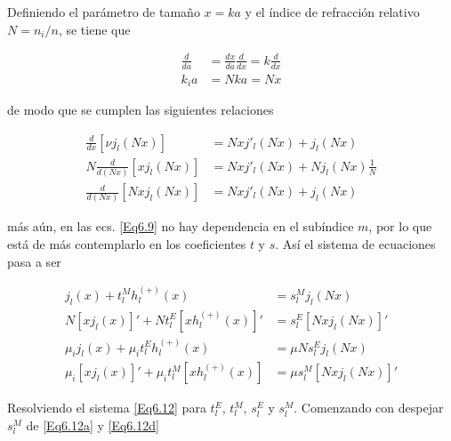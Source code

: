 Definiendo el parámetro de tamaño $x=ka$ y el índice de refracción relativo $N=n_i/n$, se tiene que

\begin{equation}
\begin{aligned}
\frac{d}{da}&=\frac{dx}{da}\frac{d}{dx}=k\frac{d}{dx}\\
k_ia&=Nka=Nx
\end{aligned}
\end{equation}

de modo que se cumplen las siguientes relaciones

\begin{subequations}
\begin{align}
\frac{d}{dx}[\nu j_l(Nx)]&=Nx j'_l(Nx)+j_l(Nx)	\\
N\frac{d}{d(Nx)}[x j_l(Nx)]&=Nx j'_l(Nx)+Nj_l(Nx)\frac{1}{N}	\\
\frac{d}{d(Nx)}[Nx j_l(Nx)]&=Nx j'_l(Nx)+j_l(Nx)
\end{align}
\end{subequations}

más aún, en las ecs. \eqref{Eq6.9} no hay dependencia en el subíndice $m$, por lo que está de más contemplarlo en los coeficientes $t$ y $s$. Así el sistema de ecuaciones pasa a ser

\begin{subequations}
\begin{align}
j_l(x)+t_l^M h_l^{(+)}(x)						&=	s_l^M j_l(Nx)	\label{Eq6.12a}\\
N[xj_l(x)]'+N	t_l^E	[xh_l^{(+)}(x)]'	&=	s_l^E[Nx j_l(Nx)]'	\label{Eq6.12b}	\\
\mu_i j_l(x)+\mu_i t_l^E h_l^{(+)}(x)	&= 	\mu N s_l^E j_l(Nx)	\label{Eq6.12c}	\\
\mu_i [x j_l(x)]'+\mu_i t_l^M [x h_l^{(+)}(x)]	&=\mu s_l^M [Nx j_l(Nx)]'	\label{Eq6.12d}
\end{align}
\label{Eq6.12}
\end{subequations}

Resolviendo el sistema \eqref{Eq6.12} para $t_l^E$, $t_l^M$, $s_l^E$ y $s_l^M$. Comenzando con despejar $s_l^M$ de \eqref{Eq6.12a} y \eqref{Eq6.12d}

